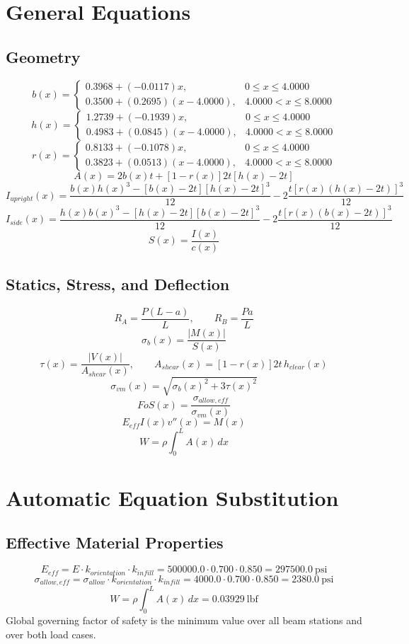 \documentclass[11pt]{article}
\begin{document}
\section*{General Equations}
\subsection*{Geometry}
\[
b(x)=\begin{cases}0.3968 + (-0.0117)x, & 0 \le x \le 4.0000\\0.3500 + (0.2695)(x-4.0000), & 4.0000 < x \le 8.0000\end{cases}
\]
\[
h(x)=\begin{cases}1.2739 + (-0.1939)x, & 0 \le x \le 4.0000\\0.4983 + (0.0845)(x-4.0000), & 4.0000 < x \le 8.0000\end{cases}
\]
\[
r(x)=\begin{cases}0.8133 + (-0.1078)x, & 0 \le x \le 4.0000\\0.3823 + (0.0513)(x-4.0000), & 4.0000 < x \le 8.0000\end{cases}
\]
\[
A(x)=2b(x)t+[1-r(x)]2t[h(x)-2t]
\]
\[
I_{upright}(x)=\frac{b(x)h(x)^3-[b(x)-2t][h(x)-2t]^3}{12}-2\frac{t[r(x)(h(x)-2t)]^3}{12}
\]
\[
I_{side}(x)=\frac{h(x)b(x)^3-[h(x)-2t][b(x)-2t]^3}{12}-2\frac{t[r(x)(b(x)-2t)]^3}{12}
\]
\[
S(x)=\frac{I(x)}{c(x)}
\]

\subsection*{Statics, Stress, and Deflection}
\[
R_A=\frac{P(L-a)}{L}, \qquad R_B=\frac{Pa}{L}
\]
\[
\sigma_b(x)=\frac{|M(x)|}{S(x)}
\]
\[
\tau(x)=\frac{|V(x)|}{A_{shear}(x)}, \qquad A_{shear}(x)=[1-r(x)]2t\,h_{clear}(x)
\]
\[
\sigma_{vm}(x)=\sqrt{\sigma_b(x)^2+3\tau(x)^2}
\]
\[
FoS(x)=\frac{\sigma_{allow,eff}}{\sigma_{vm}(x)}
\]
\[
E_{eff}I(x)v''(x)=M(x)
\]
\[
W=\rho\int_0^L A(x)\,dx
\]

\section*{Automatic Equation Substitution}
\subsection*{Effective Material Properties}
\[E_{eff} = E \cdot k_{orientation} \cdot k_{infill} = 500000.0 \cdot 0.700 \cdot 0.850 = 297500.0\ \mathrm{psi}\]
\[\sigma_{allow,eff} = \sigma_{allow} \cdot k_{orientation} \cdot k_{infill} = 4000.0 \cdot 0.700 \cdot 0.850 = 2380.0\ \mathrm{psi}\]
\[W = \rho \int_0^L A(x)\,dx = 0.03929\ \mathrm{lbf}\]
Global governing factor of safety is the minimum value over all beam stations and over both load cases.
\end{document}
